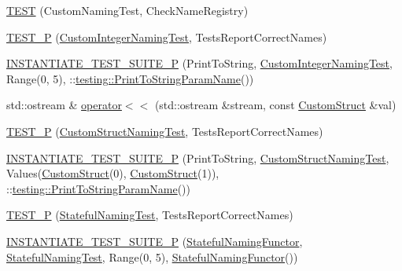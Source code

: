 \begin{DoxyCompactItemize}
\mbox{\hyperlink{googletest-master_2googletest_2test_2googletest-param-test-test_8cc_a19d5fdc7df4c845bc0f2e7c50368e2a6}{T\+E\+ST}} (Custom\+Naming\+Test, Check\+Name\+Registry)
\item 
\mbox{\hyperlink{googletest-master_2googletest_2test_2googletest-param-test-test_8cc_a0c9938b5941817c8181cab2de13ae24d}{T\+E\+S\+T\+\_\+P}} (\mbox{\hyperlink{class_custom_integer_naming_test}{Custom\+Integer\+Naming\+Test}}, Tests\+Report\+Correct\+Names)
\item 
\mbox{\hyperlink{googletest-master_2googletest_2test_2googletest-param-test-test_8cc_ae11f3d793678cba59d7f2b5e8508da06}{I\+N\+S\+T\+A\+N\+T\+I\+A\+T\+E\+\_\+\+T\+E\+S\+T\+\_\+\+S\+U\+I\+T\+E\+\_\+P}} (Print\+To\+String, \mbox{\hyperlink{class_custom_integer_naming_test}{Custom\+Integer\+Naming\+Test}}, Range(0, 5), \+::\mbox{\hyperlink{structtesting_1_1_print_to_string_param_name}{testing\+::\+Print\+To\+String\+Param\+Name}}())
\item 
std\+::ostream \& \mbox{\hyperlink{googletest-master_2googletest_2test_2googletest-param-test-test_8cc_a9751bdd724ed1a62f98208cf310bc1d9}{operator$<$$<$}} (std\+::ostream \&stream, const \mbox{\hyperlink{struct_custom_struct}{Custom\+Struct}} \&val)
\item 
\mbox{\hyperlink{googletest-master_2googletest_2test_2googletest-param-test-test_8cc_a20d9b65a9ff30edb2daf274bc13ba3d7}{T\+E\+S\+T\+\_\+P}} (\mbox{\hyperlink{class_custom_struct_naming_test}{Custom\+Struct\+Naming\+Test}}, Tests\+Report\+Correct\+Names)
\item 
\mbox{\hyperlink{googletest-master_2googletest_2test_2googletest-param-test-test_8cc_a387c3e2c74686ab03b23325a384730b6}{I\+N\+S\+T\+A\+N\+T\+I\+A\+T\+E\+\_\+\+T\+E\+S\+T\+\_\+\+S\+U\+I\+T\+E\+\_\+P}} (Print\+To\+String, \mbox{\hyperlink{class_custom_struct_naming_test}{Custom\+Struct\+Naming\+Test}}, Values(\mbox{\hyperlink{struct_custom_struct}{Custom\+Struct}}(0), \mbox{\hyperlink{struct_custom_struct}{Custom\+Struct}}(1)), \+::\mbox{\hyperlink{structtesting_1_1_print_to_string_param_name}{testing\+::\+Print\+To\+String\+Param\+Name}}())
\item 
\mbox{\hyperlink{googletest-master_2googletest_2test_2googletest-param-test-test_8cc_a567e8106d701ab56bdc7e610ef119450}{T\+E\+S\+T\+\_\+P}} (\mbox{\hyperlink{class_stateful_naming_test}{Stateful\+Naming\+Test}}, Tests\+Report\+Correct\+Names)
\item 
\mbox{\hyperlink{googletest-master_2googletest_2test_2googletest-param-test-test_8cc_a260030f4afd03030d56cbddcc921bca0}{I\+N\+S\+T\+A\+N\+T\+I\+A\+T\+E\+\_\+\+T\+E\+S\+T\+\_\+\+S\+U\+I\+T\+E\+\_\+P}} (\mbox{\hyperlink{struct_stateful_naming_functor}{Stateful\+Naming\+Functor}}, \mbox{\hyperlink{class_stateful_naming_test}{Stateful\+Naming\+Test}}, Range(0, 5), \mbox{\hyperlink{struct_stateful_naming_functor}{Stateful\+Naming\+Functor}}())

\end{DoxyCompactItemize}
